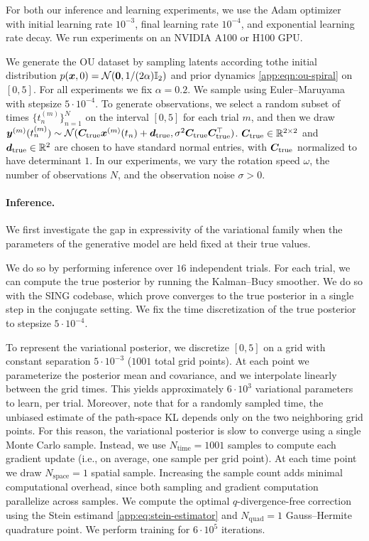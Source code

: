 For both our inference and learning experiments, we use the Adam optimizer \cite{kingma2014adam} with initial learning rate $10^{-3}$, final learning rate $10^{-4}$, and exponential learning rate decay. We run experiments on an NVIDIA A100 or H100 GPU.

We generate the OU dataset by sampling latents according tothe initial distribution $p(\boldsymbol{x}, 0) = \mathcal{N}(\boldsymbol{0}, 1/(2\alpha) \mathbb{I}_2)$ and prior dynamics \cref{app:eqn:ou-spiral} on $[0, 5]$. 
For all experiments we fix $\alpha = 0.2$. 
We sample using Euler--Maruyama with stepsize $5 \cdot 10^{-4}$. To generate observations, we select a random subset of times $\{t_n^{(m)}\}_{n=1}^N$ on the interval $[0, 5]$ for each trial $m$, and then we draw $\boldsymbol{y}^{(m)}(t_n^{(m)}) \sim \mathcal{N}(\boldsymbol{C}_{\mathrm{true}} \boldsymbol{x}^{(m)}(t_n) + \boldsymbol{d}_{\mathrm{true}}, \sigma^2 \boldsymbol{C}_{\mathrm{true}}\boldsymbol{C}_{\mathrm{true}}^\top)$. $\boldsymbol{C}_{\mathrm{true}} \in \mathbb{R}^{2 \times 2}$ and  $\boldsymbol{d}_{\mathrm{true}} \in \mathbb{R}^2$ are chosen to have standard normal entries, with $\boldsymbol{C}_{\mathrm{true}}$ normalized to have determinant $1$.
In our experiments, we vary the rotation speed $\omega$, the number of observations $N$, and the observation noise $\sigma > 0$.

\paragraph{Inference.}
We first investigate the gap in expressivity of the variational family when the parameters of the generative model are held fixed at their true values. 

We do so by performing inference over $16$ independent trials. 
For each trial, we can compute the true posterior by running the Kalman--Bucy smoother. 
We do so with the SING codebase, which \citet{hu2025sing} prove converges to the true posterior in a single step in the conjugate setting. 
We fix the time discretization of the true posterior to stepsize $5 \cdot 10^{-4}$.

To represent the variational posterior, we discretize $[0, 5]$ on a grid with constant separation $5 \cdot 10^{-3}$ ($1001$ total grid points). 
At each point we parameterize the posterior mean and covariance, and we interpolate linearly between the grid times. 
This yields approximately $6 \cdot 10^3$ variational parameters to learn, per trial. 
Moreover, note that for a randomly sampled time, the unbiased estimate of the path-space KL depends only on the two neighboring grid points. 
For this reason, the variational posterior is slow to converge using a single Monte Carlo sample. 
Instead, we use $N_{\mathrm{time}} = 1001$ samples to compute each gradient update (i.e., on average, one sample per grid point). 
At each time point we draw $N_{\mathrm{space}} = 1$ spatial sample. 
Increasing the sample count adds minimal computational overhead, since both sampling and gradient computation parallelize across samples.
We compute the optimal $q$-divergence-free correction using the Stein estimand \cref{app:eq:stein-estimator} and $N_{\mathrm{quad}} = 1$ Gauss--Hermite quadrature point.
We perform training for $6 \cdot 10^5$ iterations.

